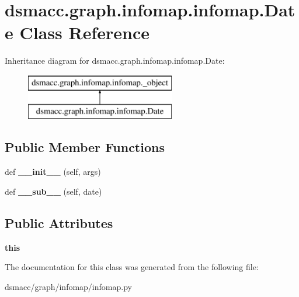 \hypertarget{classdsmacc_1_1graph_1_1infomap_1_1infomap_1_1Date}{}\section{dsmacc.\+graph.\+infomap.\+infomap.\+Date Class Reference}
\label{classdsmacc_1_1graph_1_1infomap_1_1infomap_1_1Date}
Inheritance diagram for dsmacc.\+graph.\+infomap.\+infomap.\+Date\+:\begin{figure}[H]
\begin{center}
\leavevmode
\includegraphics[height=2.000000cm]{classdsmacc_1_1graph_1_1infomap_1_1infomap_1_1Date}
\end{center}
\end{figure}
\subsection*{Public Member Functions}
\begin{DoxyCompactItemize}
\item 
\mbox{\label{classdsmacc_1_1graph_1_1infomap_1_1infomap_1_1Date_af93948b698f7f79ea87c019b76489610}} 
def {\bfseries \+\_\+\+\_\+init\+\_\+\+\_\+} (self, args)
\item 
\mbox{\label{classdsmacc_1_1graph_1_1infomap_1_1infomap_1_1Date_a4d9e547dce99f61c788dc9e8ec3cd079}} 
def {\bfseries \+\_\+\+\_\+sub\+\_\+\+\_\+} (self, date)
\end{DoxyCompactItemize}
\subsection*{Public Attributes}
\begin{DoxyCompactItemize}
\item 
\mbox{\label{classdsmacc_1_1graph_1_1infomap_1_1infomap_1_1Date_a98cd76afad681e91a7d5439f58ece38d}} 
{\bfseries this}
\end{DoxyCompactItemize}


The documentation for this class was generated from the following file\+:\begin{DoxyCompactItemize}
\item 
dsmacc/graph/infomap/infomap.\+py\end{DoxyCompactItemize}
